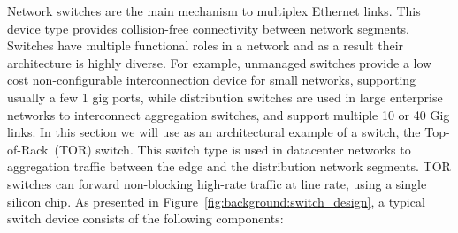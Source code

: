 Network switches are the main mechanism to multiplex Ethernet links.  This
device type provides collision-free connectivity between network segments.
Switches have multiple functional roles in a network and as a result their
architecture is highly diverse. For example, unmanaged switches provide a low
cost non-configurable interconnection device for small networks, supporting
usually a few 1 gig ports, while distribution switches are used in large
enterprise networks to interconnect aggregation switches, and support multiple
10 or 40 Gig links.  In this section we will use as an architectural example of
a switch, the Top-of-Rack~(TOR) switch.  This switch type is used in datacenter
networks to aggregation traffic between the edge and the distribution network
segments.  TOR switches can forward non-blocking high-rate traffic at line rate,
using a single silicon chip.  As presented in
Figure~\ref{fig:background:switch_design}, a typical switch device consists of
the following components:

